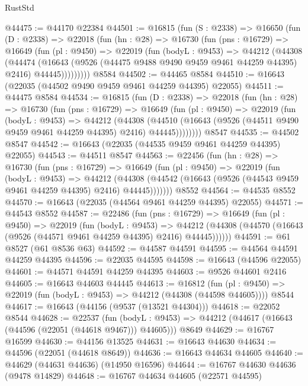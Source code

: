 \begin{lexlean}{RustStd}
\begin{coremodule}
@44475 := @44170 @22384
@44501 := @16815
    (fun (S : @2338) =>
    @16650
      (fun (D : @2338) =>
      @22018
        (fun (hn : @28) =>
        @16730
          (fun (pns : @16729) =>
          @16649
            (fun (pl : @9450) =>
            @22019
              (fun (bodyL : @9453) =>
              @44212
                (@44308
                  (@44474
                    (@16643
                      (@9526 (@44475 @9488 @9490 @9459 @9461 @44259 @44395) @2416)
                      @44445)))))))))
    @8584
@44502 := @44465 @8584
@44510 := @16643 (@22035 (@44502 @9490 @9459 @9461 @44259 @44395) @22055)
@44511 := @44475 @8584
@44534 := @16815
    (fun (D : @2338) =>
    @22018
      (fun (hn : @28) =>
      @16730
        (fun (pns : @16729) =>
        @16649
          (fun (pl : @9450) =>
          @22019
            (fun (bodyL : @9453) =>
            @44212
              (@44308
                (@44510
                  (@16643 (@9526 (@44511 @9490 @9459 @9461 @44259 @44395) @2416) @44445))))))))
    @8547
@44535 := @44502 @8547
@44542 := @16643 (@22035 (@44535 @9459 @9461 @44259 @44395) @22055)
@44543 := @44511 @8547
@44563 := @22456
    (fun (hn : @28) =>
    @16730
      (fun (pns : @16729) =>
      @16649
        (fun (pl : @9450) =>
        @22019
          (fun (bodyL : @9453) =>
          @44212
            (@44308 (@44542 (@16643 (@9526 (@44543 @9459 @9461 @44259 @44395) @2416) @44445)))))))
    @8552
@44564 := @44535 @8552
@44570 := @16643 (@22035 (@44564 @9461 @44259 @44395) @22055)
@44571 := @44543 @8552
@44587 := @22486
    (fun (pns : @16729) =>
    @16649
      (fun (pl : @9450) =>
      @22019
        (fun (bodyL : @9453) =>
        @44212 (@44308 (@44570 (@16643 (@9526 (@44571 @9461 @44259 @44395) @2416) @44445))))))
@44591 := @61 @8527 (@61 @8536 @63)
@44592 := @44587 @44591
@44595 := @44564 @44591 @44259 @44395
@44596 := @22035 @44595
@44598 := @16643 (@44596 @22055)
@44601 := @44571 @44591 @44259 @44395
@44603 := @9526 @44601 @2416
@44605 := @16643 @44603 @44445
@44613 := @16812
    (fun (pl : @9450) => @22019 (fun (bodyL : @9453) => @44212 (@44308 (@44598 @44605))))
    @8544
@44617 := @16643 (@44156 (@9537 (@13521 @44304)))
@44618 := @22052 @8544
@44628 := @22537
    (fun (bodyL : @9453) => @44212 (@44617 (@16643 (@44596 (@22051 (@44618 @9467))) @44605)))
    @8649
@44629 := @16767 @16599
@44630 := @44156 @13525
@44631 := @16643 @44630
@44634 := @44596 (@22051 (@44618 @8649))
@44636 := @16643 @44634 @44605
@44640 := @44629 (@44631 @44636) (@14950 @16596)
@44644 := @16767 @44630 @44636 (@9478 @14829)
@44648 := @16767 @44634 @44605 (@22571 @44595)

\end{coremodule}
\end{lexlean}
